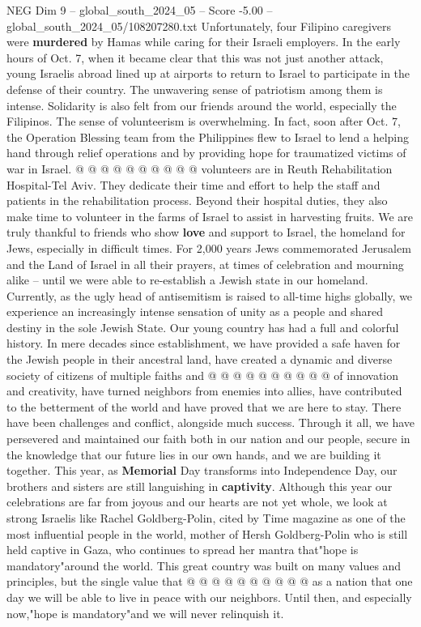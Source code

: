 \begin{textsample}{NEG Dim 9 – global\_south\_2024\_05 – Score -5.00 – global\_south\_2024\_05/108207280.txt}
Unfortunately, four Filipino caregivers were \textbf{murdered} by Hamas while caring for their Israeli employers.
In the early hours of Oct. 7, when it became clear that this was not just another attack, young Israelis abroad lined up at airports to return to Israel to participate in the defense of their country.
The unwavering sense of patriotism among them is intense.
Solidarity is also felt from our friends around the world, especially the Filipinos.
The sense of volunteerism is overwhelming.
In fact, soon after Oct. 7, the Operation Blessing team from the Philippines flew to Israel to lend a helping hand through relief operations and by providing hope for traumatized victims of war in Israel. @ @ @ @ @ @ @ @ @ @ volunteers are in Reuth Rehabilitation Hospital-Tel Aviv.
They dedicate their time and effort to help the staff and patients in the rehabilitation process.
Beyond their hospital duties, they also make time to volunteer in the farms of Israel to assist in harvesting fruits.
We are truly thankful to friends who show \textbf{love} and support to Israel, the homeland for Jews, especially in difficult times.
For 2,000 years Jews commemorated Jerusalem and the Land of Israel in all their prayers, at times of celebration and mourning alike -- until we were able to re-establish a Jewish state in our homeland.
Currently, as the ugly head of antisemitism is raised to all-time highs globally, we experience an increasingly intense sensation of unity as a people and shared destiny in the sole Jewish State.
Our young country has had a full and colorful history.
In mere decades since establishment, we have provided a safe haven for the Jewish people in their ancestral land, have created a dynamic and diverse society of citizens of multiple faiths and @ @ @ @ @ @ @ @ @ @ of innovation and creativity, have turned neighbors from enemies into allies, have contributed to the betterment of the world and have proved that we are here to stay.
There have been challenges and conflict, alongside much success.
Through it all, we have persevered and maintained our faith both in our nation and our people, secure in the knowledge that our future lies in our own hands, and we are building it together.
This year, as \textbf{Memorial} Day transforms into Independence Day, our brothers and sisters are still languishing in \textbf{captivity}.
Although this year our celebrations are far from joyous and our hearts are not yet whole, we look at strong Israelis like Rachel Goldberg-Polin, cited by Time magazine as one of the most influential people in the world, mother of Hersh Goldberg-Polin who is still held captive in Gaza, who continues to spread her mantra that"hope is mandatory"around the world.
This great country was built on many values and principles, but the single value that @ @ @ @ @ @ @ @ @ @ as a nation that one day we will be able to live in peace with our neighbors.
Until then, and especially now,"hope is mandatory"and we will never relinquish it.

\end{textsample}

